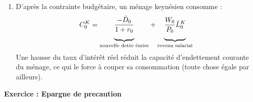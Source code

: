 \documentclass[a4paper,11pt]{article}
\begin{document}
\begin{enumerate}
\item D'apr\`{e}s la contrainte budg\'{e}taire, un m\'{e}nage keyn\'{e}sien
consomme :%
\begin{equation}
C_{0}^{K}=\underset{\text{nouvelle dette \'{e}mise}}{\underbrace{\underset{}{%
\frac{-\bar{D}_{0}}{1+r_{0}}}}}+\underset{\text{revenu
salarial}}{\underbrace{\underset{}{\frac{W_{0}}{P_{0}}\bar{L}_{0}^{K}}}}
\label{2 - Conso keynesien}
\end{equation}%
Une hausse du taux d'int\'{e}r\^{e}t r\'{e}el r\'{e}duit la capacit\'{e}
d'endettement courante du m\'{e}nage, ce qui le force \`{a} couper sa
consommation (toute chose \'{e}gale par ailleurs).



\end{enumerate}

\bigskip


\noindent \textbf{Exercice : Epargne de precaution}

\smallskip
\end{document}
